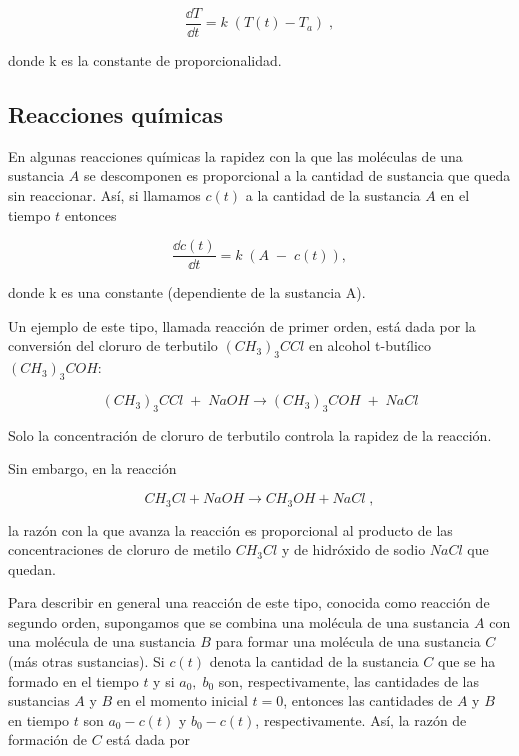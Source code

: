 \begin{small}
  \begin{equation*}
  	\dfrac {\dd T}{\dd t}= k\; \left( T(t)-T_a \right)\; ,
  \end{equation*}
  
donde k es la constante de proporcionalidad. 

\subsection{Reacciones químicas} 
	 
En algunas reacciones químicas la rapidez con la que las moléculas de una sustancia $A$ se descomponen es proporcional a la cantidad de sustancia que queda sin reaccionar. Así, si llamamos $c(t)$ a la cantidad de la sustancia $A$ en el tiempo $t$ entonces 
  
 \begin{equation*}
 	\dfrac {\dd c(t)}{\dd t}= k\;( A\;- \; c(t)) ,
 \end{equation*} 
    
donde k es una constante (dependiente de la sustancia A).
  
   
Un ejemplo de este tipo, llamada reacción de primer orden, está dada por la conversión del cloruro de terbutilo $(CH_3)_3CCl$ en alcohol t-butílico $(CH_3)_3COH$: 
   
\begin{equation*}
	(CH_3)_3CCl \; + \; NaOH \longrightarrow (CH_3)_3COH\; + \; NaCl
\end{equation*}
   
   Solo la concentración de cloruro de terbutilo controla la rapidez de la reacción. 
   
   Sin embargo, en la reacción 
   
   \begin{equation*}
   	CH_3Cl + NaOH \longrightarrow  CH_3OH + NaCl \; ,
   \end{equation*}
   
la razón con la que avanza la reacción es proporcional al producto de las concentraciones de cloruro de metilo $CH_3Cl$ y de hidróxido de sodio $NaCl$ que quedan. 
   
   Para describir en general una reacción de este tipo, conocida como reacción de segundo orden, supongamos que se combina una molécula de una sustancia $A$ con una molécula de una sustancia $B$ para formar una molécula de una sustancia $C$ (más otras sustancias). Si $c(t)$ denota la cantidad de la sustancia $C$ que se ha formado en el tiempo $t$ y si $a_0,\; b_0$ son, respectivamente, las cantidades de las sustancias $A$ y $B$ en el momento inicial $t = 0$, entonces las cantidades de $A$ y $B$ en tiempo $t$ son $a_0- c(t)$ y $b_0- c(t)$, respectivamente. Así, la razón de formación de $C$ está dada por 
   

\end{small}
